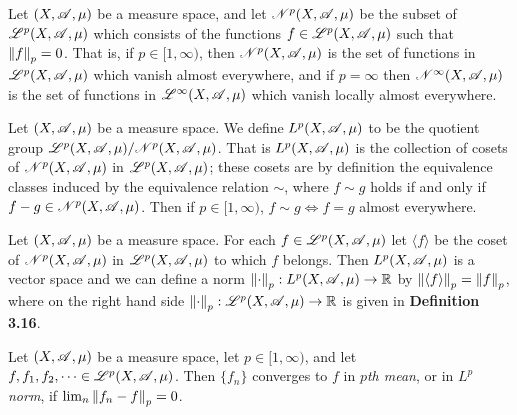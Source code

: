 \documentclass[12pt]{article}
\begin{document}
\begin{definition}[$\mathscr{N}^p$]
    Let $(X,\mathscr{A},\mu)$ be a measure space, and let $\mathscr{N}^p(X,\mathscr{A},\mu)$ be the subset of $\mathscr{L}^p(X,\mathscr{A},\mu)$ which consists of the functions $f\in \mathscr{L}^p(X,\mathscr{A},\mu)$ such that $\left\lVert f\right\rVert_p=0$. That is, if $p\in[1,\infty)$, then $\mathscr{N}^p(X,\mathscr{A},\mu)$ is the set of functions in $\mathscr{L}^p(X,\mathscr{A},\mu)$ which vanish almost everywhere, and if $p=\infty$ then $\mathscr{N}^\infty(X,\mathscr{A},\mu)$ is the set of functions in $\mathscr{L}^\infty(X,\mathscr{A},\mu)$ which vanish locally almost everywhere.
\end{definition}
\newpage
\begin{definition}[$L^p$]
    Let $(X,\mathscr{A},\mu)$ be a measure space. We define $L^p(X,\mathscr{A},\mu)$ to be the quotient group $\mathscr{L}^p(X,\mathscr{A},\mu)/\mathscr{N}^p(X,\mathscr{A},\mu)$. That is $L^p(X,\mathscr{A},\mu)$ is the collection of cosets of $\mathscr{N}^p(X,\mathscr{A},\mu)$ in $\mathscr{L}^p(X,\mathscr{A},\mu)$; these cosets are by definition the equivalence classes induced by the equivalence relation $\sim$, where $f\sim g$ holds if and only if $f-g\in\mathscr{N}^p(X,\mathscr{A},\mu)$. Then if $p\in[1,\infty)$, $f\sim g\Longleftrightarrow f=g$ almost everywhere.
\end{definition}
\begin{definition}[Norm on $L^p$]
     Let $(X,\mathscr{A},\mu)$ be a measure space. For each $f\in\mathscr{L}^p(X,\mathscr{A},\mu)$ let $\langle f\rangle$ be the coset of $\mathscr{N}^p(X,\mathscr{A},\mu)$ in $\mathscr{L}^p(X,\mathscr{A},\mu)$ to which $f$ belongs. Then $L^p(X,\mathscr{A},\mu)$ is a vector space and we can define a norm $\left\lVert\cdot\right\rVert_p:L^p(X,\mathscr{A},\mu)\to \mathbb{R}$ by $\left\lVert\langle f\rangle\right\rVert_p=\left\lVert f\right\rVert_p$, where on the right hand side $\left\lVert\cdot\right\rVert_p:\mathscr{L}^p(X,\mathscr{A},\mu)\to \mathbb{R}$ is given in \textbf{Definition 3.16}.
\end{definition}
\begin{definition}
    Let $(X,\mathscr{A},\mu)$ be a measure space, let $p\in [1,\infty)$, and let $f,f_1,f_2,\cdots \in \mathscr{L}^p(X,\mathscr{A},\mu)$. Then $\{f_n\}$ converges to $f$ in $p$\textit{th mean}, or in $L^p$ \textit{norm}, if $\lim_n \left\lVert f_n-f\right\rVert_p=0$.
\end{definition}
\end{document}
